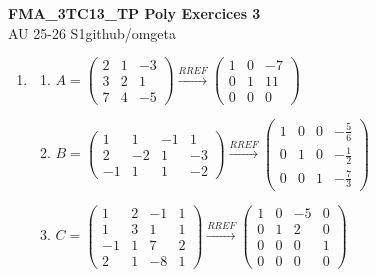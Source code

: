 \documentclass[12pt, a4paper]{article}
\newcommand{\mytitle}{FMA\_3TC13\_TP Poly Exercices 3}
\newcommand{\myauthor}{github/omgeta}
\newcommand{\mydate}{AU 25-26 S1}
\begin{document}
\raggedright
\footnotesize
\begin{center}
{\normalsize{\textbf{\mytitle}}} \\
{\footnotesize{\mydate\hspace{2pt}\textemdash\hspace{2pt}\myauthor}}
\end{center}
\begin{enumerate}[label=3.\arabic*., start=25]
  \item  
    \begin{enumerate}[\arabic*.]
      \item $A = \left(\begin{array}{ccc} 2 & 1 & -3\\ 3 & 2 & 1\\ 7 & 4 & -5 \end{array}\right) \xrightarrow{RREF} \left(\begin{array}{ccc} 1 & 0 & -7\\ 0 & 1 & 11\\ 0 & 0 & 0 \end{array}\right)$

      \item $B = \left(\begin{array}{cccc} 1 & 1 & -1 & 1\\ 2 & -2 & 1 & -3\\ -1 & 1 & 1 & -2 \end{array}\right) \xrightarrow{RREF} \left(\begin{array}{cccc} 1 & 0 & 0 & -\frac{5}{6}\\ 0 & 1 & 0 & -\frac{1}{2}\\ 0 & 0 & 1 & -\frac{7}{3} \end{array}\right)$

      \item $C = \left(\begin{array}{cccc} 1 & 2 & -1 & 1\\ 1 & 3 & 1 & 1\\ -1 & 1 & 7 & 2\\ 2 & 1 & -8 & 1 \end{array}\right) \xrightarrow{RREF} \left(\begin{array}{cccc} 1 & 0 & -5 & 0\\ 0 & 1 & 2 & 0\\ 0 & 0 & 0 & 1\\ 0 & 0 & 0 & 0 \end{array}\right)$
    \end{enumerate}


\end{enumerate}
\end{document}
